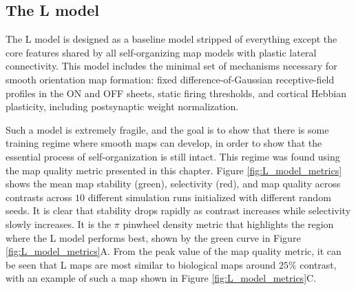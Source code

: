\documentclass[phd,ianc,twoside]{infthesis}
\begin{document}
\subsection{The L model}

The L model is designed as a baseline model stripped of everything
except the core features shared by all self-organizing map models with
plastic lateral connectivity. This model includes the minimal set of
mechanisms necessary for smooth orientation map formation: fixed
difference-of-Gaussian receptive-field profiles in the ON and OFF
sheets, static firing thresholds, and cortical Hebbian plasticity,
including postsynaptic weight normalization.

Such a model is extremely fragile, and the goal is to show that there is
some training regime where smooth maps can develop, in order to show that
the essential process of self-organization is still intact. This regime
was found using the map quality metric presented in this chapter.
Figure \ref{fig:L_model_metrics} shows the mean map stability (green),
selectivity (red), and map quality across contrasts across $10$
different simulation runs initialized with different random seeds. It is
clear that stability drops rapidly as contrast increases while
selectivity slowly increases. It is the $\pi$ pinwheel density metric
that highlights the region where the L model performs best, shown by the
green curve in Figure \ref{fig:L_model_metrics}A. From the peak value of
the map quality metric, it can be seen that L maps are most similar to
biological maps around $25\%$ contrast, with an example of such a map
shown in Figure \ref{fig:L_model_metrics}C.
\end{document}
